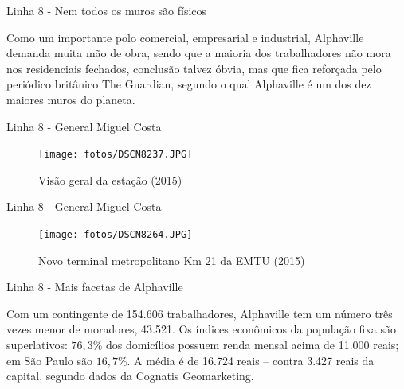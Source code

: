 \documentclass[spectratio=169, portuguese]{beamer}
\begin{document}

\begin{frame}{Linha 8 - Nem todos os muros são físicos}
	
	Como um importante polo comercial, empresarial e industrial, Alphaville demanda muita mão de obra, sendo que a maioria dos trabalhadores não mora nos residenciais fechados, conclusão talvez óbvia, mas que fica reforçada pelo periódico britânico The Guardian, segundo o qual Alphaville é um dos dez maiores muros do planeta\cite{muro}.

\end{frame}


\begin{frame}{Linha 8 - General Miguel Costa}
	
	\begin{figure}[h]
		\caption{Visão geral da estação (2015)}
		\texttt{[image: fotos/DSCN8237.JPG]}
	\end{figure}
	
\end{frame}


\begin{frame}{Linha 8 - General Miguel Costa}
	
	\begin{figure}[h]
		\caption{Novo terminal metropolitano Km 21 da EMTU (2015)}
		\texttt{[image: fotos/DSCN8264.JPG]}
	\end{figure}
	
\end{frame}


\begin{frame}{Linha 8 - Mais facetas de Alphaville}
	
	\begin{exampleblock}{}
		Com um contingente de 154.606 trabalhadores, Alphaville tem um número três vezes menor de moradores, 43.521. Os índices econômicos da população fixa são superlativos: $76,3$\% dos domicílios possuem renda mensal acima de 11.000 reais; em São Paulo são $16,7$\%. A média é de 16.724 reais -- contra 3.427 reais da capital, segundo dados da Cognatis Geomarketing.
		\cite{poloadm}
	\end{exampleblock}
	
\end{frame}
\end{document}
